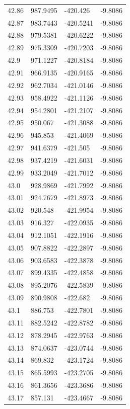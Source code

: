 \begin{table}[H]
\begin{tabular}{llll}
42.86 & 987.9495 & -420.426 & -9.8086 \\
42.87 & 983.7443 & -420.5241 & -9.8086 \\
42.88 & 979.5381 & -420.6222 & -9.8086 \\
42.89 & 975.3309 & -420.7203 & -9.8086 \\
42.9 & 971.1227 & -420.8184 & -9.8086 \\
42.91 & 966.9135 & -420.9165 & -9.8086 \\
42.92 & 962.7034 & -421.0146 & -9.8086 \\
42.93 & 958.4922 & -421.1126 & -9.8086 \\
42.94 & 954.2801 & -421.2107 & -9.8086 \\
42.95 & 950.067 & -421.3088 & -9.8086 \\
42.96 & 945.853 & -421.4069 & -9.8086 \\
42.97 & 941.6379 & -421.505 & -9.8086 \\
42.98 & 937.4219 & -421.6031 & -9.8086 \\
42.99 & 933.2049 & -421.7012 & -9.8086 \\
43.0 & 928.9869 & -421.7992 & -9.8086 \\
43.01 & 924.7679 & -421.8973 & -9.8086 \\
43.02 & 920.548 & -421.9954 & -9.8086 \\
43.03 & 916.327 & -422.0935 & -9.8086 \\
43.04 & 912.1051 & -422.1916 & -9.8086 \\
43.05 & 907.8822 & -422.2897 & -9.8086 \\
43.06 & 903.6583 & -422.3878 & -9.8086 \\
43.07 & 899.4335 & -422.4858 & -9.8086 \\
43.08 & 895.2076 & -422.5839 & -9.8086 \\
43.09 & 890.9808 & -422.682 & -9.8086 \\
43.1 & 886.753 & -422.7801 & -9.8086 \\
43.11 & 882.5242 & -422.8782 & -9.8086 \\
43.12 & 878.2945 & -422.9763 & -9.8086 \\
43.13 & 874.0637 & -423.0744 & -9.8086 \\
43.14 & 869.832 & -423.1724 & -9.8086 \\
43.15 & 865.5993 & -423.2705 & -9.8086 \\
43.16 & 861.3656 & -423.3686 & -9.8086 \\
43.17 & 857.131 & -423.4667 & -9.8086 \\

\end{tabular}
\end{table}
